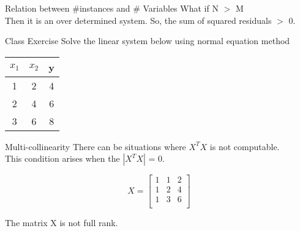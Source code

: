 \documentclass{beamer}
\begin{document}
\begin{frame}{Relation between \#instances and \# Variables}
   What if N $>$ M\\
   \pause   Then it is an over determined system. So, the sum of squared residuals $>$ 0.
\end{frame}





\begin{frame}{Class Exercise}
Solve the linear system below using normal equation method
\begin{center}
	\begin{tabular}{||c c | c||} 
		\hline
		$x_{1}$  & $x_{2}$ & y  \\ [0.5ex] 
		\hline\hline
		1 & 2 & 4 \\
		2 & 4 & 6\\
		3 & 6 & 8\\
		\hline
	\end{tabular}
\end{center}
\end{frame}
\begin{frame}{Multi-collinearity}
There can be situations where $X^{T}X$ is not computable. \\
\pause This condition arises when the $|X^{T}X|$ = 0.

\begin{equation}
X = \begin{bmatrix}
1 & 1& 2\\
1 & 2& 4\\
1 & 3& 6\\
\end{bmatrix}
\end{equation}

\pause The matrix X is not full rank. 
\end{frame}
\end{document}

